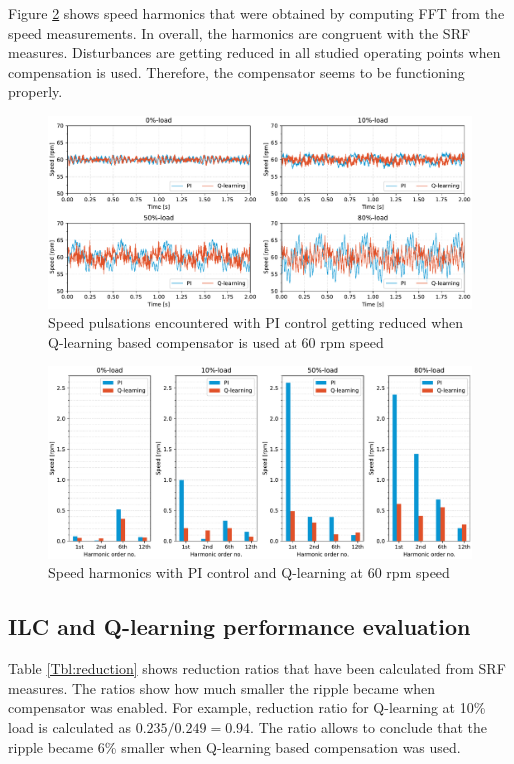 Figure \ref{Fig:experimentl-qlr-harmonics-speed} shows speed harmonics that were obtained by computing FFT from the speed measurements. In overall, the harmonics are congruent with the SRF measures. Disturbances are getting reduced in all studied operating points when compensation is used. Therefore, the compensator seems to be functioning properly.
\begin{figure}[p] 
    \centering
    \includegraphics[width=1.0\linewidth]{images/PI-QLR-comparison-time-domain.pdf} 
    \caption{Speed pulsations encountered with PI control getting reduced when Q-learning based compensator is used at 60 rpm speed}
    \label{Fig:experimentl-qlr-speed}
\end{figure}

\begin{figure}[p]
    \centering
    \includegraphics[width=1.0\linewidth]{images/PI-QLR-comparison-harmonics.pdf} 
    \caption{Speed harmonics with PI control and Q-learning at $60$ rpm speed}
    \label{Fig:experimentl-qlr-harmonics-speed}
\end{figure}


\subsection{ILC and Q-learning performance evaluation}
Table \ref{Tbl:reduction} shows reduction ratios that have been calculated from SRF measures. The ratios show how much smaller the ripple became when compensator was enabled. For example, reduction ratio for Q-learning at 10\% load is calculated as $0.235 / 0.249 = 0.94$. The ratio allows to conclude that the ripple became 6\% smaller when Q-learning based compensation was used.

